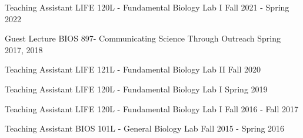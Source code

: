 

\begin{cvoutreaches}

  \cvoutreach
    {Teaching Assistant}
    {LIFE 120L - Fundamental Biology Lab I}
    {Fall 2021 - Spring 2022}

  \cvoutreach
    {Guest Lecture}
    {BIOS 897- Communicating Science Through Outreach}
    {Spring 2017, 2018}

  \cvoutreach
    {Teaching Assistant}
    {LIFE 121L - Fundamental Biology Lab II}
    {Fall 2020}
    
  \cvoutreach
    {Teaching Assistant}
    {LIFE 120L - Fundamental Biology Lab I}
    {Spring 2019}
  
  \cvoutreach
   {Teaching Assistant}
    {LIFE 120L - Fundamental Biology Lab I}
    {Fall 2016 - Fall 2017}
    
  \cvoutreach
    {Teaching Assistant}
    {BIOS 101L - General Biology Lab}
    {Fall 2015 - Spring 2016}
\end{cvoutreaches}
